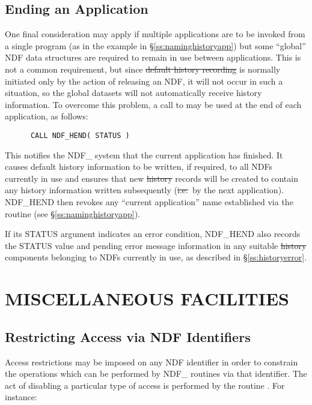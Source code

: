 \subsection{\label{ss:endhistory}Ending an Application}

One final consideration may apply if multiple applications are to be
invoked from a single program (as in the example in
\S\ref{ss:naminghistoryapp}) but some ``global'' NDF data structures
are required to remain in use between applications. This is not a common
requirement, but since \st{default history recording\/} is normally initiated
only by the action of releasing an NDF, it will not occur in such a
situation, so the global datasets will not automatically receive
history information. To overcome this problem, a call to  may
be used at the end of each application, as follows:

\small
\begin{verbatim}
      CALL NDF_HEND( STATUS )
\end{verbatim}
\normalsize

This notifies the NDF\_ system that the current application has
finished. It causes default history information to be written, if
required, to all NDFs currently in use and ensures that new
\st{history\/} records will be created to contain any history
information 
written subsequently (\st{i.e.}\ by the next application). NDF\_HEND
then revokes any ``current application'' name established via the
 routine (see \S\ref{ss:naminghistoryapp}).

If its STATUS argument indicates an error condition, NDF\_HEND also
records the STATUS value and pending error message information in any
suitable \st{history\/} components belonging to NDFs currently in
use, as described in \S\ref{ss:historyerror}.


\section{MISCELLANEOUS FACILITIES}

\subsection{\label{ss:restrictingaccess}Restricting Access via NDF Identifiers}

Access restrictions may be imposed on any NDF identifier in order to
constrain the operations which can be performed by NDF\_ routines via that
identifier. 
The act of disabling a particular type of access is performed by the routine
. 
For instance:

